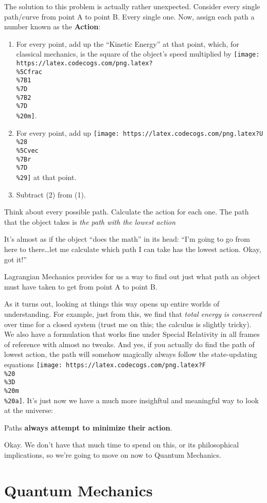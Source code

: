 \documentclass[]{article}
\begin{document}
The solution to this problem is actually rather unexpected. Consider every
single path/curve from point A to point B. Every single one. Now, assign each
path a number known as the \textbf{Action}:

\begin{enumerate}
\def\labelenumi{\arabic{enumi}.}
\tightlist
\item
  For every point, add up the ``Kinetic Energy'' at that point, which, for
  classical mechanics, is the square of the object's speed multiplied by
  \texttt{[image: https://latex.codecogs.com/png.latex?\\\%5Cfrac\\\%7B1\\\%7D\\\%7B2\\\%7D\\\%20m]}.
\item
  For every point, add up
  \texttt{[image: https://latex.codecogs.com/png.latex?U\\\%28\\\%5Cvec\\\%7Br\\\%7D\\\%29]}
  at that point.
\item
  Subtract (2) from (1).
\end{enumerate}

Think about every possible path. Calculate the action for each one. The path
that the object takes is \emph{the path with the lowest action}

It's almost as if the object ``does the math'' in its head: ``I'm going to go
from here to there\ldots{}let me calculate which path I can take has the lowest
action. Okay, got it!''

Lagrangian Mechanics provides for us a way to find out just what path an object
must have taken to get from point A to point B.

As it turns out, looking at things this way opens up entire worlds of
understanding. For example, just from this, we find that \emph{total energy is
conserved} over time for a closed system (trust me on this; the calculus is
slightly tricky). We also have a formulation that works fine under Special
Relativity in all frames of reference with almost no tweaks. And yes, if you
actually do find the path of lowest action, the path will somehow magically
always follow the state-updating equations
\texttt{[image: https://latex.codecogs.com/png.latex?F\\\%20\\\%3D\\\%20m\\\%20a]}. It's
just now we have a much more insighftul and meaningful way to look at the
universe:

Paths \textbf{always attempt to minimize their action}.

Okay. We don't have that much time to spend on this, or its philosophical
implications, so we're going to move on now to Quantum Mechanics.

\section{Quantum Mechanics}\label{quantum-mechanics}
\end{document}
